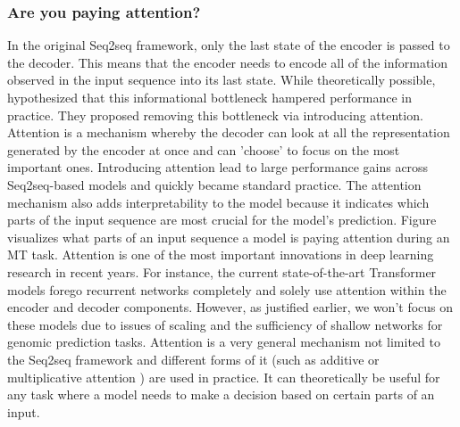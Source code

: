 \subsubsection{Are you paying attention?}
In the original Seq2seq framework, only the last state of the encoder is passed to the decoder. This means that the encoder needs to encode all of the information observed in the input sequence into its last state. While theoretically possible, \cite{attention} hypothesized that this informational bottleneck hampered performance in practice. They proposed removing this bottleneck via introducing attention. Attention is a mechanism whereby the decoder can look at all the representation generated by the encoder at once and can 'choose' to focus on the most important ones. Introducing attention lead to large performance gains across Seq2seq-based models and quickly became standard practice. The attention mechanism also adds interpretability to the model because it indicates which parts of the input sequence are most crucial for the model's prediction. Figure %
 visualizes what parts of an input sequence a model is paying attention during an MT task. Attention is one of the most important innovations in deep learning research in recent years. For instance, the current state-of-the-art Transformer models \cite{allyouneed} \cite{bert} \cite{gpt3} forego recurrent networks completely and solely use attention within the encoder and decoder components.
However, as justified earlier, we won't focus on these models due to issues of scaling and the sufficiency of shallow networks for genomic prediction tasks.
Attention is a very general mechanism not limited to the Seq2seq framework and different forms of it (such as additive \cite{attention} or multiplicative attention \cite{allyouneed}) are used in practice. It can theoretically be useful for any task where a model needs to make a decision based on certain parts of an input.
